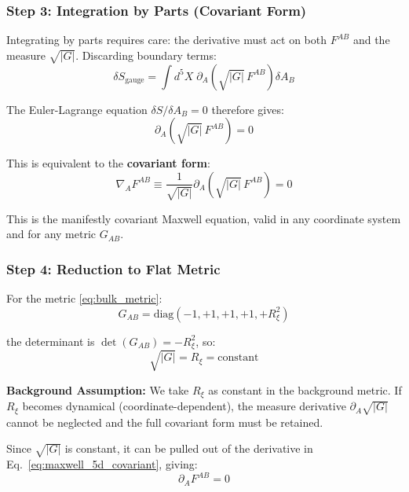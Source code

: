 \subsubsection{Step 3: Integration by Parts (Covariant Form)}

Integrating by parts requires care: the derivative must act on both $F^{AB}$ and the measure $\sqrt{|G|}$. Discarding boundary terms:
\begin{equation}
\delta S_{\text{gauge}} = \int d^5X \; \partial_A\left(\sqrt{|G|} \, F^{AB}\right) \delta A_B
\end{equation}

The Euler-Lagrange equation $\delta S / \delta A_B = 0$ therefore gives:
\begin{equation}
\partial_A\left(\sqrt{|G|} \, F^{AB}\right) = 0
\label{eq:maxwell_5d_covariant}
\end{equation}

This is equivalent to the \textbf{covariant form}:
\begin{equation}
\nabla_A F^{AB} \equiv \frac{1}{\sqrt{|G|}} \partial_A\left(\sqrt{|G|} \, F^{AB}\right) = 0
\end{equation}

This is the manifestly covariant Maxwell equation, valid in any coordinate system and for any metric $G_{AB}$.

\subsubsection{Step 4: Reduction to Flat Metric}

For the metric \eqref{eq:bulk_metric}:
\begin{equation}
G_{AB} = \text{diag}(-1, +1, +1, +1, +R_\xi^2)
\end{equation}

the determinant is $\det(G_{AB}) = -R_\xi^2$, so:
\begin{equation}
\sqrt{|G|} = R_\xi = \text{constant}
\end{equation}

\noindent\textbf{Background Assumption:} We take $R_\xi$ as constant in the background metric. If $R_\xi$ becomes dynamical (coordinate-dependent), the measure derivative $\partial_A \sqrt{|G|}$ cannot be neglected and the full covariant form must be retained.

Since $\sqrt{|G|}$ is constant, it can be pulled out of the derivative in Eq.~\eqref{eq:maxwell_5d_covariant}, giving:
\begin{equation}
\boxed{\partial_A F^{AB} = 0}
\label{eq:maxwell_5d_derived}
\end{equation}


